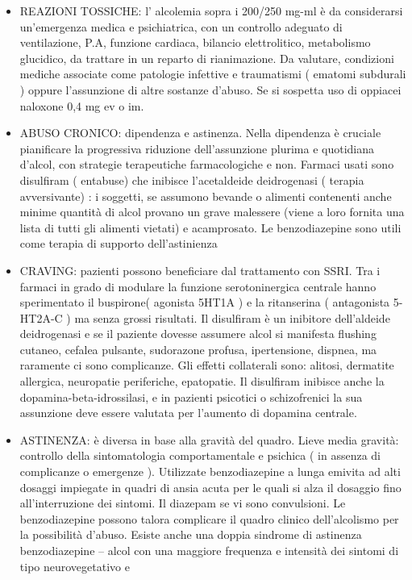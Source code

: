 \begin{itemize}
\item
REAZIONI TOSSICHE: l' alcolemia sopra i 200/250 mg-ml è da considerarsi
un'emergenza medica e psichiatrica, con un controllo adeguato di
ventilazione, P.A, funzione cardiaca, bilancio elettrolitico,
metabolismo glucidico, da trattare in un reparto di rianimazione. Da
valutare, condizioni mediche associate come patologie infettive e
traumatismi ( ematomi subdurali ) oppure l'assunzione di altre sostanze
d'abuso. Se si sospetta uso di oppiacei naloxone 0,4 mg ev o im.
\item
ABUSO CRONICO: dipendenza e astinenza. Nella dipendenza è cruciale
pianificare la progressiva riduzione dell'assunzione plurima e
quotidiana d'alcol, con strategie terapeutiche farmacologiche e non.
Farmaci usati sono disulfiram ( entabuse) che inibisce l'acetaldeide
deidrogenasi ( terapia avversivante) : i soggetti, se assumono bevande o
alimenti contenenti anche minime quantità di alcol provano un grave
malessere (viene a loro fornita una lista di tutti gli alimenti vietati)
e acamprosato. Le benzodiazepine sono utili come terapia di supporto
dell'astinienza
\item
CRAVING: pazienti possono beneficiare dal trattamento con SSRI. Tra i
farmaci in grado di modulare la funzione serotoninergica centrale hanno
sperimentato il buspirone( agonista 5HT1A ) e la ritanserina (
antagonista 5-HT2A-C ) ma senza grossi risultati. Il disulfiram è un
inibitore dell'aldeide deidrogenasi e se il paziente dovesse assumere
alcol si manifesta flushing cutaneo, cefalea pulsante, sudorazone
profusa, ipertensione, dispnea, ma raramente ci sono complicanze. Gli
effetti collaterali sono: alitosi, dermatite allergica, neuropatie
periferiche, epatopatie. Il disulfiram inibisce anche la
dopamina-beta-idrossilasi, e in pazienti psicotici o schizofrenici la
sua assunzione deve essere valutata per l'aumento di dopamina centrale.
\item
ASTINENZA: è diversa in base alla gravità del quadro. Lieve media
gravità: controllo della sintomatologia comportamentale e psichica ( in
assenza di complicanze o emergenze ). Utilizzate benzodiazepine a lunga
emivita ad alti dosaggi impiegate in quadri di ansia acuta per le quali
si alza il dosaggio fino all'interruzione dei sintomi. Il diazepam se vi
sono convulsioni. Le benzodiazepine possono talora complicare il quadro
clinico dell'alcolismo per la possibilità d'abuso. Esiste anche una
doppia sindrome di astinenza benzodiazepine -- alcol con una maggiore
frequenza e intensità dei sintomi di tipo neurovegetativo e

\end{itemize}
